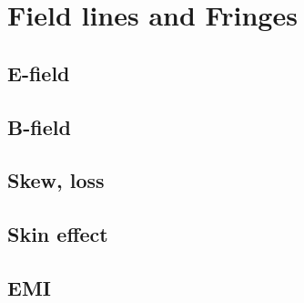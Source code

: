 
\section{Field lines and Fringes}

\subsection{E-field}
\subsection{B-field}
\subsection{Skew, loss}
\subsection{Skin effect}
\subsection{EMI}
